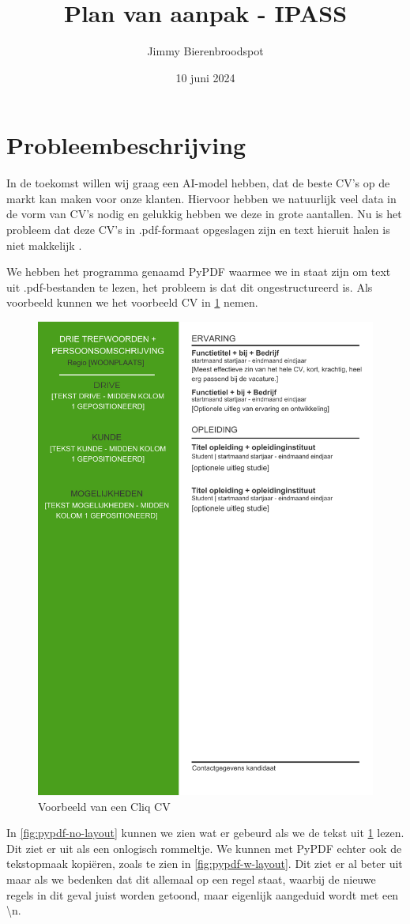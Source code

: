 \documentclass{article}
\title{Plan van aanpak - IPASS}
\author{Jimmy Bierenbroodspot}
\date{10 juni 2024}
\begin{document}
\begin{titlepage}
  \maketitle
\end{titlepage}

\section{Probleembeschrijving}

In de toekomst willen wij graag een AI-model hebben, dat de beste CV's op de
markt kan maken voor onze klanten. Hiervoor hebben we natuurlijk veel data in de
vorm van CV's nodig en gelukkig hebben we deze in grote aantallen. Nu is het
probleem dat deze CV's in .pdf-formaat opgeslagen zijn en text hieruit halen is
niet makkelijk \cite{timalsina-2024}.

We hebben het programma genaamd PyPDF\cite{unknown-author-2024} waarmee we in
staat zijn om text uit .pdf-bestanden te lezen, het probleem is dat dit
ongestructureerd is. Als voorbeeld kunnen we het voorbeeld CV in \ref{fig:cv-example}
nemen.

\begin{figure}[ht]
  \begin{center}
    \includegraphics[width=0.5\linewidth]{pdf/voorbeeld_aicv_cv.pdf}
  \end{center}
  \caption{Voorbeeld van een Cliq CV}
  \label{fig:cv-example}
\end{figure}

In \ref{fig:pypdf-no-layout} kunnen we zien wat er gebeurd als we de tekst
uit \ref{fig:cv-example} lezen. Dit ziet er uit als een onlogisch rommeltje.
We kunnen met PyPDF echter ook de tekstopmaak kopiëren, zoals te zien in
\ref{fig:pypdf-w-layout}. Dit ziet er al beter uit maar als we bedenken dat
dit allemaal op een regel staat, waarbij de nieuwe regels in dit geval juist
worden getoond, maar eigenlijk aangeduid wordt met een \textbackslash n.
\end{document}

